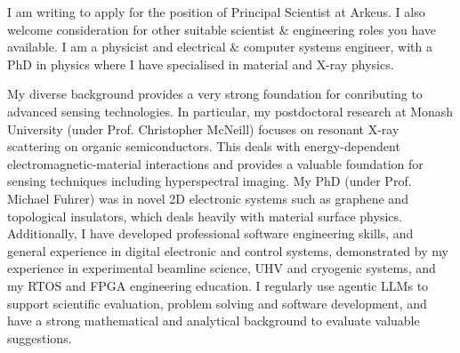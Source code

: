 \documentclass[10pt,a4paper,ragged2e,withhyper,paragraphstrue]{altacv}
\begin{document}
{    \vspace{-0.5em}
    I am writing to apply for the position of Principal Scientist at Arkeus. I also welcome consideration for other suitable scientist \& engineering roles you have available. I am a physicist and electrical \& computer systems engineer, with a PhD in physics where I have specialised in material and X-ray physics.
    
    My diverse background provides a very strong foundation for conributing to advanced sensing technologies. In particular, my postdoctoral research at Monash University (under Prof. Christopher McNeill) focuses on resonant X-ray scattering on organic semiconductors. This deals with energy-dependent electromagnetic-material interactions and provides a valuable foundation for sensing techniques including hyperspectral imaging. My PhD (under Prof. Michael Fuhrer) was in novel 2D electronic systems such as graphene and topological insulators, which deals heavily with material surface physics. Additionally, I have developed professional software engineering skills, and general experience in digital electronic and control systems, demonstrated by my experience in experimental beamline science, UHV and cryogenic systems, and my RTOS and FPGA engineering education. I regularly use agentic LLMs to support scientific evaluation, problem solving and software development, and have a strong mathematical and analytical background to evaluate valuable suggestions.
        
}
\end{document}

